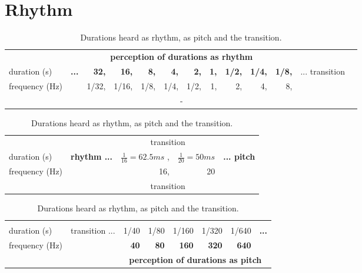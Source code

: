 \documentclass[format=acmsmall, review=false, screen=true]{acmart}
\begin{document}
\section{Rhythm}\label{subsec:ritmo}
\begin{table}[htp!]
\caption{Durations heard as rhythm, as pitch and the transition.}
\begin{tabular}{  l | r r r r   r r r    r r r || r r  } \hline
& \multicolumn{10}{c}{\bf perception of durations as rhythm} & \multicolumn{2}{c}{}  \\
	duration (s) & \multirow{2}{*}{\bf ...}     & {\bf 32,}     & {\bf 16,}   & {\bf 8,}  & {\bf 4,}   & {\bf 2,}   & {\bf 1,}   & {\bf 1/2,} & {\bf 1/4,} & {\bf 1/8,} & \multirow{2}{*}{ ... transition } & \\
frequency (Hz) & & {\color{gray} 1/32,}   & {\color{gray} 1/16,} & {\color{gray} 1/8,} & {\color{gray} 1/4,} & {\color{gray} 1/2,} &  {\color{gray} 1,}  & {\color{gray} 2,}   & {\color{gray} 4,}   & {\color{gray} 8,} & & \\
& \multicolumn{10}{c}{ - } & \multicolumn{2}{c}{} \\ \hline
\end{tabular}
\vspace{.2cm}

	\begin{tabular}{  l | p{1.7cm}  || r r || r } \hline
& \multicolumn{1}{c}{} & \multicolumn{2}{c}{transition} &  \\
duration (s) & \multirow{2}{*}{\bf rhythm ...} & $\frac{1}{16}=62.5ms$ , & $\frac{1}{20}=50ms$ & \multirow{2}{*}{\bf ... pitch} \\
frequency (Hz) & & 16, & 20 &  \\
& \multicolumn{1}{c}{} & \multicolumn{2}{c}{transition} & \\ \hline
\end{tabular}
\hspace{3.36cm}
\vspace{.2cm}

	\begin{tabular}{  l | p{1.7cm} || r r r r r r }\hline
& \multicolumn{1}{c}{} &  \\
	duration (s) & \multirow{2}{*}{transition ...} & {\color{gray} 1/40} & {\color{gray} 1/80  } & {\color{gray} 1/160 } & {\color{gray} 1/320 } & {\color{gray} 1/640 } & \multirow{2}{*}{\bf ... } \\
frequency (Hz) & & {\bf 40}   & {\bf 80}   & {\bf 160}   & {\bf 320}   & {\bf 640}   & \\
& \multicolumn{1}{c}{} & \multicolumn{6}{c}{\bf perception of durations as pitch} \\ \hline
\end{tabular}
\hspace{2.70cm}
\label{tab:duracoes}
\end{table}
\end{document}
